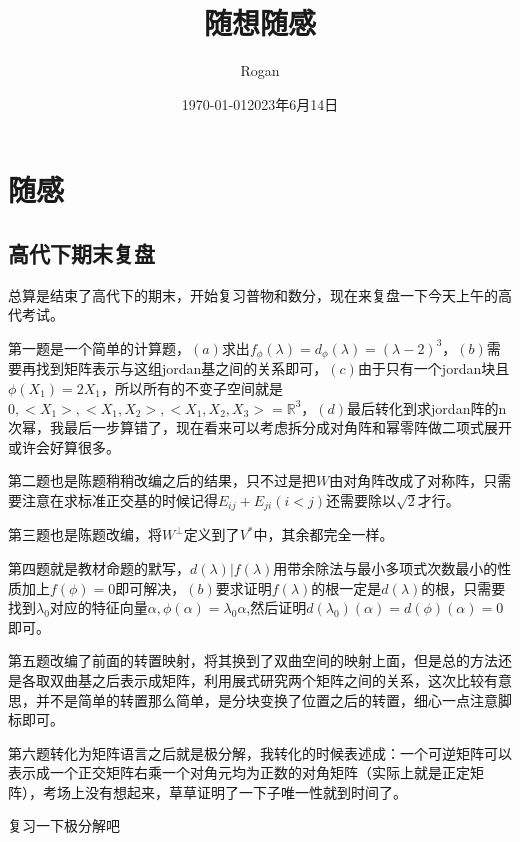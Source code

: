 \documentclass[12pt, a4paper, oneside]{ctexart}
\title{随想随感}
\author{Rogan}
\date{\today}
\begin{document}
\maketitle

\tableofcontents
\newpage
\section{随感}

\subsection{高代下期末复盘}

\date{2023年6月14日}

总算是结束了高代下的期末，开始复习普物和数分，现在来复盘一下今天上午的高代考试。

第一题是一个简单的计算题，$(a)$求出$f_{\phi}(\lambda)=d_{\phi}(\lambda)=(\lambda-2)^3$，$(b)$需要再找到矩阵表示与这组jordan基之间的关系即可，$(c)$由于只有一个jordan块且$\phi(X_1)=2X_1$，所以所有的不变子空间就是$0,<X_1>,<X_1,X_2>,<X_1,X_2,X_3>=\mathbb{R} ^3$，$(d)$最后转化到求jordan阵的n次幂，我最后一步算错了，现在看来可以考虑拆分成对角阵和幂零阵做二项式展开或许会好算很多。

第二题也是陈题稍稍改编之后的结果，只不过是把$W$由对角阵改成了对称阵，只需要注意在求标准正交基的时候记得$E_{ij}+E_{ji}(i<j)$还需要除以$\sqrt{2}$才行。

第三题也是陈题改编，将$W^{\bot }$定义到了$V^*$中，其余都完全一样。

第四题就是教材命题的默写，$d(\lambda)|f(\lambda)$用带余除法与最小多项式次数最小的性质加上$f(\phi)=0$即可解决，$(b)$要求证明$f(\lambda)$的根一定是$d(\lambda)$的根，只需要找到$\lambda_0$对应的特征向量$\alpha,\phi(\alpha)=\lambda_0\alpha$,然后证明$d(\lambda_0)(\alpha)=d(\phi)(\alpha)=0$即可。

第五题改编了前面的转置映射，将其换到了双曲空间的映射上面，但是总的方法还是各取双曲基之后表示成矩阵，利用展式研究两个矩阵之间的关系，这次比较有意思，并不是简单的转置那么简单，是分块变换了位置之后的转置，细心一点注意脚标即可。

第六题转化为矩阵语言之后就是极分解，我转化的时候表述成：一个可逆矩阵可以表示成一个正交矩阵右乘一个对角元均为正数的对角矩阵（实际上就是正定矩阵），考场上没有想起来，草草证明了一下子唯一性就到时间了。

复习一下极分解吧
\end{document}
